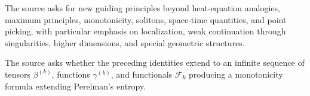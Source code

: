 \begin{remark}
\label{rem:chow-iii-ch17-guiding-principles-problem}
The source asks for new guiding principles beyond heat-equation analogies,
maximum principles, monotonicity, solitons, space-time quantities, and point
picking, with particular emphasis on localization, weak continuation through
singularities, higher dimensions, and special geometric structures.
\end{remark}

\begin{remark}
\label{rem:chow-iii-ch17-higher-loop-problem}
The source asks whether the preceding identities extend to an infinite
sequence of tensors $\beta^{(k)}$, functions $\gamma^{(k)}$, and functionals
$\mathcal F_k$ producing a monotonicity formula extending Perelman's entropy.
\end{remark}

